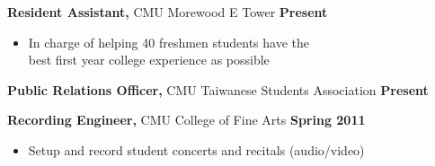 \documentclass[sectioned]{dsyangres}
\begin{document}
\begin{resume}
\textbf{Resident Assistant,} CMU Morewood E Tower \hfill \textbf{Present}
  \begin{itemize} \itemsep -2pt
    \item In charge of helping 40 freshmen students have the\\ best
      first year college experience as possible
  \end{itemize}

\textbf{Public Relations Officer,} CMU Taiwanese Students
  Association \hfill \textbf{ Present}

\textbf{Recording Engineer,} CMU College of Fine Arts \hfill
\textbf{ Spring 2011}
  \begin{itemize} \itemsep -2pt
    \item Setup and record student concerts and recitals (audio/video)
  \end{itemize}


\end{resume}
\end{document}
